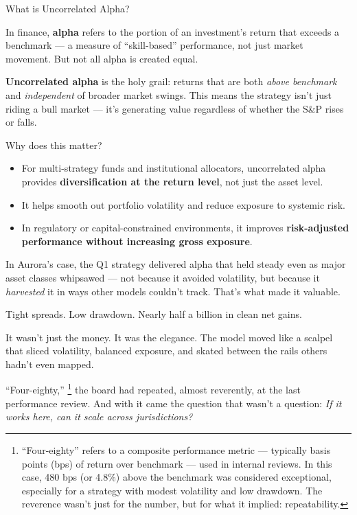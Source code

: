 \begin{TechnicalSidebar}{What is Uncorrelated Alpha?}

  In finance, \textbf{alpha} refers to the portion of an investment’s return that exceeds a benchmark — a measure of 
  “skill-based” performance, not just market movement. But not all alpha is created equal.
  
  \medskip
  
  \textbf{Uncorrelated alpha} is the holy grail: returns that are both \textit{above benchmark} and \textit{independent} 
  of broader market swings. This means the strategy isn't just riding a bull market — it’s generating value regardless 
  of whether the S\&P rises or falls.
  
  \medskip
  
  Why does this matter?

  \medskip
  
  \begin{itemize}
    \item For multi-strategy funds and institutional allocators, uncorrelated alpha provides \textbf{diversification 
    at the return level}, not just the asset level.
    \item It helps smooth out portfolio volatility and reduce exposure to systemic risk.
    \item In regulatory or capital-constrained environments, it improves \textbf{risk-adjusted performance without 
    increasing gross exposure}.
  \end{itemize}
  
  \medskip
  
  In Aurora’s case, the Q1 strategy delivered alpha that held steady even as major asset classes whipsawed — not because 
  it avoided volatility, but because it \textit{harvested} it in ways other models couldn't track. That’s what made 
  it valuable.
  
\end{TechnicalSidebar}

\medskip


Tight spreads.
Low drawdown.
Nearly half a billion in clean net gains.

It wasn’t just the money. It was the elegance.
The model moved like a scalpel that sliced volatility, balanced exposure, and skated between the 
rails others hadn’t even mapped.

“Four-eighty,”
\footnote{“Four-eighty” refers to a composite performance metric — typically basis points (bps) of 
return over benchmark — used in internal reviews. In this case, 480 bps (or 4.8\%) above the benchmark 
was considered exceptional, especially for a strategy with modest volatility and low drawdown. 
The reverence wasn’t just for the number, but for what it implied: repeatability.}
 the board had repeated, almost reverently, at the last performance review.
And with it came the question that wasn’t a question:
\textit{If it works here, can it scale across jurisdictions?}

